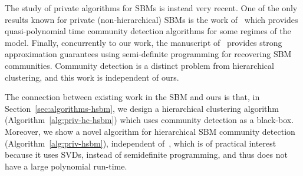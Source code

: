 The study of private algorithms for SBMs is instead very recent. One of the only results known for private (non-hierarchical) SBMs is the work of~\citet{seif2022differentially} which provides quasi-polynomial time community detection algorithms for some regimes of the model.
Finally, concurrently to our work, the manuscript of~\citet{chen2023private} provides strong approximation guarantees using semi-definite programming for recovering SBM communities. Community detection is a distinct problem from hierarchical clustering, and this work is independent of ours. 

The connection between existing work in the SBM and ours is that,
in Section~\ref{sec:algorithms-hsbm}, we design a hierarchical clustering algorithm (Algorithm~\ref{alg:priv-hc-hsbm}) which uses community detection as a black-box. Moreover, we show a novel algorithm for hierarchical SBM community detection (Algorithm~\ref{alg:priv-hsbm}), independent of~\citet{chen2023private}, which is of practical interest because it uses SVDs, instead of semidefinite programming, and thus does not have a large polynomial run-time.
